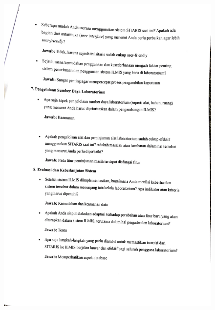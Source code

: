 \begin{figure}[h]
	\centering
	\includegraphics[width=0.82\linewidth]{konten/gambar/wawancara/wawancara_4.jpg}

	\label{fig:hasil-wawancara}
\end{figure}
